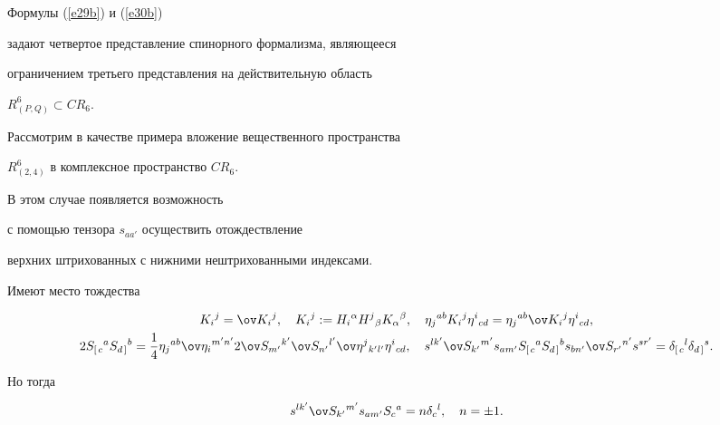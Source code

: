 Формулы (\ref{e29b}) и (\ref{e30b})


задают четвертое представление спинорного формализма, являющееся


ограничением третьего представления на действительную область


$R^6_{(P,Q)}\subset CR_6$.





Рассмотрим в качестве примера вложение вещественного пространства


$R^6_{(2,4)}$ в комплексное пространство $CR_6$.


В этом случае появляется возможность


с помощью тензора $s_{aa'}$ осуществить отождествление


верхних штрихованных с нижними нештрихованными индексами.


Имеют место тождества


\begin{gather*}


K_i{}^j=\ov K_i{}^j,\quad


K_i{}^j:=H_i{}^\alpha H^j{}_\beta K_\alpha{}^\beta,\quad


\eta_j{}^{ab}K_i{}^j\eta^i{}_{cd}=


\eta_j{}^{ab}\ov K_i{}^j\eta^i{}_{cd},\\


%


2S_{\left[\right.c}{}^a S_{d\left.\right]}{}^b=\frac{1}{4}


\eta_j{}^{ab}\ov\eta_i{}^{m'n'}2\ov S_{m'}{}^{k'}\ov S_{n'}{}^{l'}


\ov\eta^j{}_{k'l'}\eta^{i}{}_{cd},\quad


s^{lk'}\ov S_{k'}{}^{m'}s_{am'}


S_{\left[\right.c}{}^aS_{d\left.\right]}{}^b


s_{bn'}\ov S_{r'}{}^{n'}s^{sr'}=


\delta_{\left[\right.c}{}^l\delta_{d\left.\right]}{}^s.


\end{gather*}


Но тогда


\begin{equation}


\label{e32b} %


s^{lk'}\ov S_{k'}{}^{m'}s_{am'}S_c{}^a=n\delta_c{}^l,\quad


n=\pm 1.


\end{equation}


